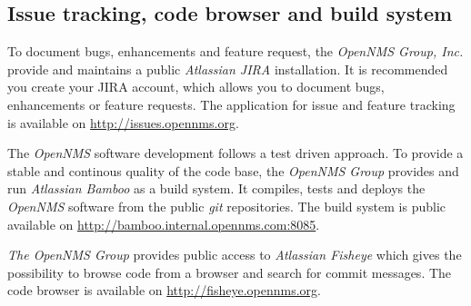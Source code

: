 \subsection*{Issue tracking, code browser and build system}
To document bugs, enhancements and feature request, the \emph{OpenNMS Group, Inc.} provide and maintains a public \emph{Atlassian JIRA} installation. It is recommended you create your JIRA account, which allows you to document bugs, enhancements or feature requests. The application for issue and feature tracking is available on \url{http://issues.opennms.org}.

The \emph{OpenNMS} software development follows a test driven approach. To provide a stable and continous quality of the code base, the \emph{OpenNMS Group} provides and run \emph{Atlassian Bamboo} as a build system. It compiles, tests and deploys the \emph{OpenNMS} software from the public \emph{git} repositories. The build system is public available on \url{http://bamboo.internal.opennms.com:8085}.

\emph{The OpenNMS Group} provides public access to \emph{Atlassian Fisheye} which gives the possibility to browse code from a browser and search for commit messages. The code browser is available on \url{http://fisheye.opennms.org}.